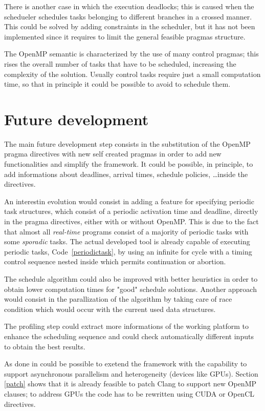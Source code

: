 \documentclass[a4paper,12pt,oneside]{book}
\begin{document}
There is another case in which the execution deadlocks; this is caused when the schedueler schedules tasks belonging to different branches in a crossed manner. This could be solved by adding constraints in the scheduler, but it has not been implemented since it requires to limit the general feasible pragmas structure. 

The OpenMP semantic is characterized by the use of many control pragmas; this rises the overall number of tasks that have to be scheduled, increasing the complexity of the solution. Usually control tasks require just a small computation time, so that in principle it could be possible to avoid to schedule them. 

\section{Future development}

The main future development step consists in the substitution of the OpenMP pragma directives with new self created pragmas in order to add new functionalities and simplify the framework. It could be possible, in principle, to add informations about deadlines, arrival times, schedule policies, \dots inside the directives. 

An interestin evolution would consist in adding a feature for specifying periodic task structures, which consist of a periodic activation time and deadline, directly in the pragma directives, either with or without OpenMP. This is due to the fact that almost all \emph{real-time} programs consist of a majority of periodic tasks with some \emph{sporadic} tasks. The actual developed tool is already capable of executing periodic tasks, Code~\ref{periodictask}, by using an infinite for cycle with a timing control sequence nested inside which permits continuation or abortion.

The schedule algorithm could also be improved with better heuristics in order to obtain lower computation times for "good" schedule solutions. Another approach would consist in the parallization of the algorithm by taking care of race condition which would occur with the current used data structures.

The profiling step could extract more informations of the working platform to enhance the scheduling sequence and could check automatically different inputs to obtain the best results.

As done in \cite{ompss} could be possible to exetend the framework with the capability to support asynchronous parallelism and heterogeneity (devices like GPUs). Section \ref{patch} shows that it is already feasible to patch Clang to support new OpenMP clauses; to address GPUs the code has to be rewritten using CUDA or OpenCL directives.
\end{document}
